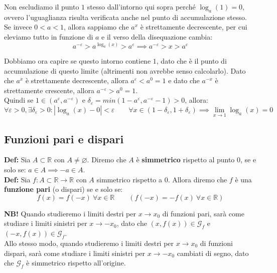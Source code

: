 \documentclass{article}
\begin{document}
\noindent Non escludiamo il punto $1$ stesso dall'intorno qui sopra perché $\log_a(1) = 0$, ovvero l'uguaglianza risulta verificata anche nel punto di accumulazione stesso.\\

\noindent Se invece $0 < a < 1$, allora sappiamo che $a^x$ è strettamente decrescente, per cui eleviamo tutto in funzione di $a$ e il verso della disequazione cambia:
\begin{equation*}
    a^{-\varepsilon} > a^{\log_a(x)} > a^\varepsilon \implies a^{-\varepsilon} > x > a^\varepsilon
\end{equation*}

\noindent Dobbiamo ora capire se questo intorno contiene $1$, dato che è il punto di accumulazione di questo limite (altrimenti non avrebbe senso calcolarlo). Dato che $a^x$ è strettamente decrescente, allora $a^\varepsilon < a^0 = 1$ e dato che $a^{-x}$ è strettamente crescente, allora $a^{-\varepsilon} > a^0 = 1$. \\
Quindi se $1 \in (a^\varepsilon, a^{-\varepsilon})$ e $\delta_\varepsilon = min(1 - a^\varepsilon, a^{-\varepsilon} - 1) > 0$, allora:
\begin{equation*}
    \forall \varepsilon > 0, \exists \delta_\varepsilon > 0 : |\log_a(x) - 0| < \varepsilon \qquad \forall x \in (1 - \delta_\varepsilon, 1 + \delta_\varepsilon) \implies \lim_{x \to 1} \log_a(x) = 0
\end{equation*}

\subsection{Funzioni pari e dispari}
\noindent\textbf{Def:} Sia $A \subset \mathbb{R}$ con $A \neq \varnothing$. Diremo che $A$ è \textbf{simmetrico} rispetto al punto $0$, se e solo se: $a \in A \implies -a \in A$.\\

\noindent\textbf{Def:} Sia $f: A \subset \mathbb{R} \xrightarrow{} \mathbb{R}$ con $A$ simmetrico rispetto a $0$. Allora diremo che $f$ è una \textbf{funzione pari} (o dispari) se e solo se:
\begin{equation*}
    f(x) = f(-x) \ \forall x \in \mathbb{R} \qquad (f(-x) = - f(x) \ \forall x \in \mathbb{R})
\end{equation*}

\noindent\textbf{NB!} Quando studieremo i limiti destri per $x \to x_0$ di funzioni pari, sarà come studiare i limiti sinistri per $x \to -x_0$, dato che $(x, f(x)) \in \mathcal{G}_f$ e $(-x, f(x)) \in \mathcal{G}_f$.\\
Allo stesso modo, quando studieremo i limiti destri per $x \to x_0$ di funzioni dispari, sarà come studiare i limiti sinistri per $x \to - x_0$ cambiati di segno, dato che $\mathcal{G}_f$ è simmetrico rispetto all'origine.\\
\end{document}
